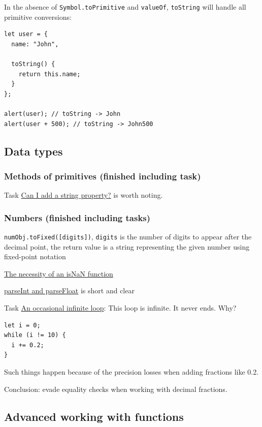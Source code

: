 \documentclass[a4paper, 12pt]{article}
\begin{document}
In the absence of \verb|Symbol.toPrimitive| and \verb|valueOf|, \verb|toString| will handle all primitive conversions:
\begin{verbatim}
let user = {
  name: "John",

  toString() {
    return this.name;
  }
};

alert(user); // toString -> John
alert(user + 500); // toString -> John500
\end{verbatim}

\subsection{Data types}
\subsubsection{Methods of primitives (finished including task)}
Task \href{https://javascript.info/primitives-methods#can-i-add-a-string-property}{Can I add a string property?} is worth noting.

\subsubsection{Numbers (finished including tasks)}
\verb|numObj.toFixed([digits])|, \verb|digits| is the number of digits to appear after the decimal point, the return value is a string representing the given number using fixed-point notation

\href{https://developer.mozilla.org/en-US/docs/Web/JavaScript/Reference/Global_Objects/isNaN#The_necessity_of_an_isNaN_function}{The necessity of an isNaN function}

\href{https://javascript.info/number#parseint-and-parsefloat}{parseInt and parseFloat} is short and clear

Task \href{https://javascript.info/number#an-occasional-infinite-loop}{An occasional infinite loop}: This loop is infinite. It never ends. Why?
\begin{verbatim}
let i = 0;
while (i != 10) {
  i += 0.2;
}
\end{verbatim}

Such things happen because of the precision losses when adding fractions like 0.2.

Conclusion: evade equality checks when working with decimal fractions.


\subsection{Advanced working with functions}
\end{document}
